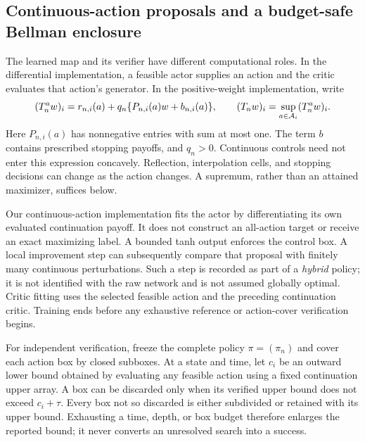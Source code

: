 \subsection{Continuous-action proposals and a budget-safe Bellman enclosure}\label{sec:r8-operator}
The learned map and its verifier have different computational roles. In the differential implementation, a feasible actor supplies an action and the critic evaluates that action's generator. In the positive-weight implementation, write
\begin{equation}\label{eq:r8-positive}
 (T_n^a w)_i=r_{n,i}(a)+q_n\{P_{n,i}(a)w+b_{n,i}(a)\},
 \qquad (T_nw)_i=\sup_{a\in\mathcal A_i}(T_n^aw)_i .
\end{equation}
Here $P_{n,i}(a)$ has nonnegative entries with sum at most one. The term $b$ contains prescribed stopping payoffs, and $q_n>0$. Continuous controls need not enter this expression concavely. Reflection, interpolation cells, and stopping decisions can change as the action changes. A supremum, rather than an attained maximizer, suffices below.

Our continuous-action implementation fits the actor by differentiating its own evaluated continuation payoff. It does not construct an all-action target or receive an exact maximizing label. A bounded tanh output enforces the control box. A local improvement step can subsequently compare that proposal with finitely many continuous perturbations. Such a step is recorded as part of a \emph{hybrid} policy; it is not identified with the raw network and is not assumed globally optimal. Critic fitting uses the selected feasible action and the preceding continuation critic. Training ends before any exhaustive reference or action-cover verification begins.

For independent verification, freeze the complete policy $\pi=(\pi_n)$ and cover each action box by closed subboxes. At a state and time, let $c_i$ be an outward lower bound obtained by evaluating any feasible action using a fixed continuation upper array. A box can be discarded only when its verified upper bound does not exceed $c_i+\tau$. Every box not so discarded is either subdivided or retained with its upper bound. Exhausting a time, depth, or box budget therefore enlarges the reported bound; it never converts an unresolved search into a success.

